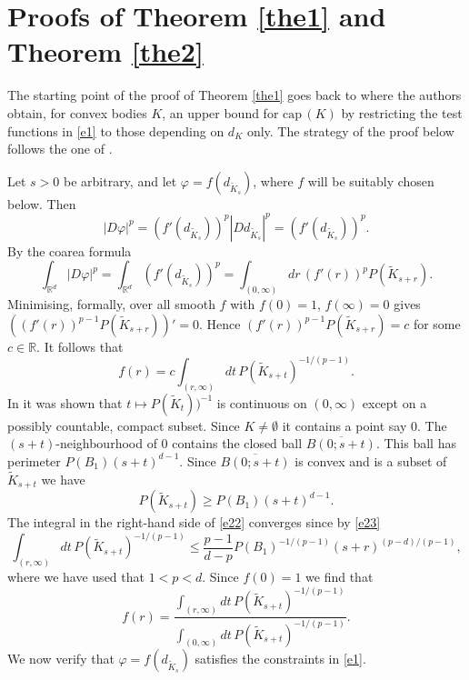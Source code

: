 \documentclass[a4paper,9pt]{article}
\newcommand{\R}{\mathbb{R}}
\def\cp{\mathrm{cap}\,}
\begin{document}
\section{Proofs of Theorem \ref{the1} and Theorem \ref{the2}\label{sec2}}

The starting point of the proof of Theorem \ref{the1} goes back to  \cite[Theorem 11]{CFG} where the authors obtain, for convex bodies $K$, an upper bound for $\cp(K)$ by restricting the test functions in \eqref{e1} to those depending on $d_K$ only. The strategy of the proof below follows the one of \cite[Theorem 1]{vdB1}.

Let $s>0$ be arbitrary, and let $\varphi=f(d_{\tilde{K}_s})$, where $f$  will be suitably chosen below. Then
\begin{equation*}%
|D\varphi|^p=(f'(d_{\tilde{K}_s}))^p|Dd_{\tilde{K}_s}|^p= (f'(d_{\tilde{K}_s}))^p.
\end{equation*}
By the coarea formula
\begin{equation}\label{e21}
\int_{\R^d}|D\varphi|^p= \int_{\R^d}(f'(d_{\tilde{K}_s}))^p=\int_{(0,\infty)}dr\, (f'(r))^pP(\tilde{K}_{s+r}).
\end{equation}
Minimising, formally, over all smooth $f$ with $f(0)=1$, $f(\infty)=0$ gives \newline $((f'(r))^{p-1}P(\tilde{K}_{s+r}))'=0.$ Hence $(f'(r))^{p-1}P(\tilde{K}_{s+r})=c$ for some $c\in \R$. It follows that
\begin{equation}\label{e22}
f(r)=c\int_{(r,\infty)}dt\,P(\tilde{K}_{s+t})^{-1/(p-1)}.
\end{equation}
In \cite{vdB1} it was shown that $t\mapsto P(\tilde{K}_t))^{-1}$ is continuous on $(0,\infty)$ except on a possibly countable, compact subset.
Since $K\ne \emptyset$ it contains a point say $0$. The $(s+t)$-neighbourhood of $0$ contains the closed ball $\overline{B(0;s+t)}$. This ball has perimeter $P(B_1)(s+t)^{d-1}$.
Since $\overline{B(0;s+t)}$ is convex and is a subset of $\tilde{K}_{s+t}$ we have
\begin{equation}\label{e23}
P(\tilde{K}_{s+t})\ge P(B_1)(s+t)^{d-1}.
\end{equation}
The integral in the right-hand side of \eqref{e22} converges since by \eqref{e23}
\begin{equation*}%
\int_{(r,\infty)}dt\,P(\tilde{K}_{s+t})^{-1/(p-1)}\le \frac{p-1}{d-p}P(B_1)^{-1/(p-1)}(s+r)^{(p-d)/(p-1)},
\end{equation*}
where we have used that $1<p<d$.
Since $f(0)=1$ we find that
\begin{equation}\label{e25}
f(r)=\frac{\int_{(r,\infty)}dt\, P(\tilde{K}_{s+t})^{-1/(p-1)}}{\int_{(0,\infty)}dt\, P(\tilde{K}_{s+t})^{-1/(p-1)}}.
\end{equation}
We now verify that $\varphi=f(d_{\tilde{K}_s})$ satisfies the constraints in \eqref{e1}.
\end{document}
